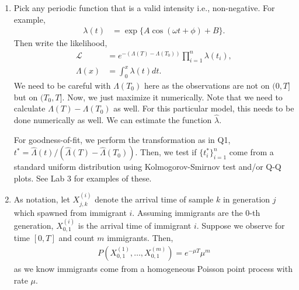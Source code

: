 \documentclass[11pt]{article}
\begin{document}
\begin{enumerate}
\item Pick any periodic function that is a valid intensity i.e., non-negative. For example,
\begin{align*}
	\lambda(t) &= \exp \{A \cos(\omega t + \phi) + B\}.
\end{align*}
Then write the likelihood,
\begin{align*}
	\mathcal{L} &= e^{-(\Lambda(T) - \Lambda(T_0))} \prod_{i=1}^n \lambda(t_i), \\
	\Lambda(x) &= \int_0^x \lambda(t) dt.
\end{align*}
We need to be careful with $\Lambda(T_0)$ here as the observations are not on $(0, T]$ but on $(T_0, T]$. Now, we just maximize it numerically. Note that we need to calculate $\Lambda(T) - \Lambda(T_0)$ as well. For this particular model, this needs to be done numerically as well. We can estimate the function $\widehat{\lambda}$.

For goodness-of-fit, we perform the transformation as in Q1, $t^* = \widehat{\Lambda}(t) / (\widehat{\Lambda}(T) - \widehat{\Lambda}(T_0))$. Then, we test if $\{t_i^*\}_{i=1}^n$ come from a standard uniform distribution using Kolmogorov-Smirnov test and/or Q-Q plots. See Lab 3 for examples of these.

\item As notation, let $X_{j,k}^{(i)}$ denote the arrival time of sample $k$ in generation $j$ which spawned from immigrant $i$. Assuming immigrants are the 0-th generation, $X_{0,1}^{(i)}$ is the arrival time of immigrant $i$. Suppose we observe for time $[0, T]$ and count $m$ immigrants. Then,
\begin{align*}
	P(X_{0,1}^{(1)}, \dots, X_{0,1}^{(m)})  = e^{-\mu T} \mu^m
\end{align*}
as we know immigrants come from a homogeneous Poisson point process with rate $\mu$.


\end{enumerate}
\end{document}
